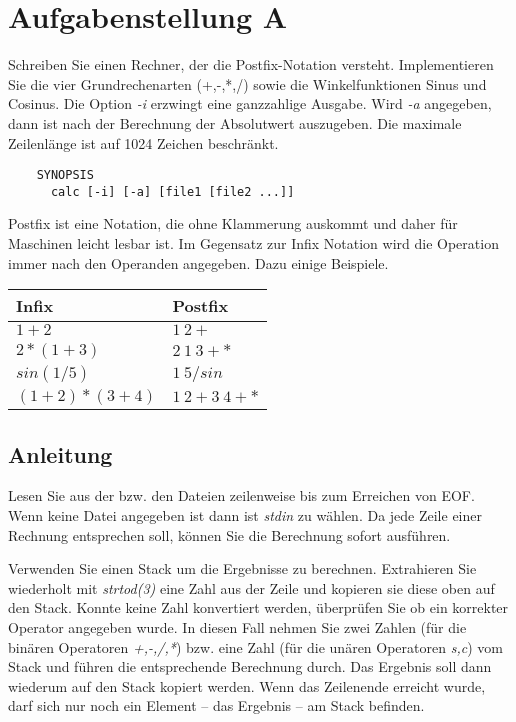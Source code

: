 




\section*{Aufgabenstellung A}
Schreiben Sie einen Rechner, der die Postfix-Notation versteht. 
Implementieren Sie die vier Grundrechenarten (+,-,*,/) sowie die Winkelfunktionen Sinus und Cosinus. 
Die Option \emph{-i} erzwingt eine ganzzahlige Ausgabe. Wird \emph{-a} angegeben, 
dann ist nach der Berechnung der Absolutwert auszugeben. Die maximale Zeilenlänge ist auf 1024 Zeichen beschränkt.

\begin{verbatim}
	SYNOPSIS
	  calc [-i] [-a] [file1 [file2 ...]]
\end{verbatim}

Postfix ist eine Notation, die ohne Klammerung auskommt und daher für Maschinen leicht lesbar ist. Im Gegensatz zur Infix Notation wird die Operation immer nach den Operanden angegeben. Dazu einige Beispiele.

\begin{tabular}{ll}
\hline
Infix & Postfix \\ \hline
$1+2$ & $1\:2 + $ \\
$2*(1+3)$ & $2\:1\:3 + * $ \\
$sin(1/5)$ & $1\:5 / sin $ \\ 
$(1+2)*(3+4)$ & $1\:2 + 3\:4 + *$ \\
\hline
\end{tabular}

\subsection*{Anleitung}
Lesen Sie aus der bzw. den Dateien zeilenweise bis zum Erreichen von EOF. Wenn keine Datei angegeben ist dann ist \emph{stdin} zu wählen.
Da jede Zeile einer Rechnung entsprechen soll, können Sie die Berechnung sofort ausführen.

Verwenden Sie einen Stack um die Ergebnisse zu berechnen. 
Extrahieren Sie wiederholt mit \emph{strtod(3)} eine Zahl aus der Zeile und kopieren sie diese oben auf den Stack. Konnte keine Zahl konvertiert werden, überprüfen Sie ob ein korrekter Operator angegeben wurde. In diesen Fall nehmen Sie zwei Zahlen (für die binären Operatoren \emph{+,-,/,*}) bzw. eine Zahl (für die unären Operatoren \emph{s,c}) vom Stack und führen die entsprechende Berechnung durch. Das Ergebnis soll dann wiederum auf den Stack kopiert werden.
Wenn das Zeilenende erreicht wurde, darf sich nur noch ein Element -- das Ergebnis -- am Stack befinden.   

